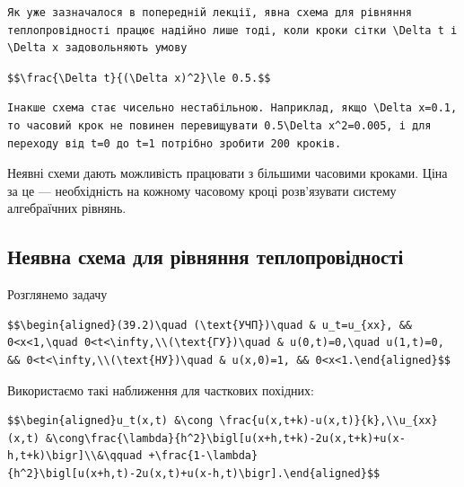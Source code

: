 \documentclass[
  ukrainian,
]{article}
\begin{document}
\begin{verbatim}
Як уже зазначалося в попередній лекції, явна схема для рівняння теплопровідності працює надійно лише тоді, коли кроки сітки \Delta t і \Delta x задовольняють умову
\end{verbatim}

\begin{verbatim}
$$\frac{\Delta t}{(\Delta x)^2}\le 0.5.$$
\end{verbatim}

\begin{verbatim}
Інакше схема стає чисельно нестабільною. Наприклад, якщо \Delta x=0.1, то часовий крок не повинен перевищувати 0.5\Delta x^2=0.005, і для переходу від t=0 до t=1 потрібно зробити 200 кроків.
\end{verbatim}

Неявні схеми дають можливість працювати з більшими часовими кроками.
Ціна за це --- необхідність на кожному часовому кроці розв'язувати
систему алгебраїчних рівнянь.

\subsection{Неявна схема для рівняння
теплопровідності}\label{ux43dux435ux44fux432ux43dux430-ux441ux445ux435ux43cux430-ux434ux43bux44f-ux440ux456ux432ux43dux44fux43dux43dux44f-ux442ux435ux43fux43bux43eux43fux440ux43eux432ux456ux434ux43dux43eux441ux442ux456}

Розглянемо задачу

\begin{verbatim}
$$\begin{aligned}(39.2)\quad (\text{УЧП})\quad & u_t=u_{xx}, && 0<x<1,\quad 0<t<\infty,\\(\text{ГУ})\quad & u(0,t)=0,\quad u(1,t)=0, && 0<t<\infty,\\(\text{НУ})\quad & u(x,0)=1, && 0<x<1.\end{aligned}$$
\end{verbatim}

Використаємо такі наближення для часткових похідних:

\begin{verbatim}
$$\begin{aligned}u_t(x,t) &\cong \frac{u(x,t+k)-u(x,t)}{k},\\u_{xx}(x,t) &\cong\frac{\lambda}{h^2}\bigl[u(x+h,t+k)-2u(x,t+k)+u(x-h,t+k)\bigr]\\&\qquad +\frac{1-\lambda}{h^2}\bigl[u(x+h,t)-2u(x,t)+u(x-h,t)\bigr].\end{aligned}$$
\end{verbatim}
\end{document}
